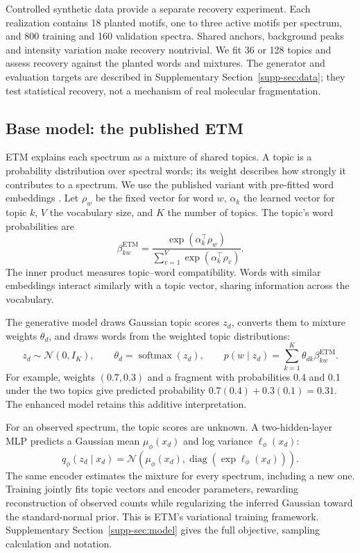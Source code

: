 \documentclass[10pt,a4paper]{article}
\newcommand{\softmax}{\operatorname{softmax}}
\begin{document}
Controlled synthetic data provide a separate recovery experiment. Each
realization contains 18 planted motifs, one to three active motifs per
spectrum, and 800 training and 160 validation spectra. Shared anchors,
background peaks and intensity variation make recovery nontrivial. We fit
36 or 128 topics and assess recovery against the planted words and mixtures.
The generator and evaluation targets are described in Supplementary
Section~\ref{supp-sec:data}; they test statistical recovery, not a mechanism
of real molecular fragmentation.

\subsection{Base model: the published ETM}
\label{sec:base-etm}

ETM explains each spectrum as a mixture of shared topics. A topic is a
probability distribution over spectral words; its weight describes how
strongly it contributes to a spectrum. We use the published variant with
pre-fitted word embeddings \cite{dieng2020}. Let $\rho_w$ be the fixed vector
for word $w$, $\alpha_k$ the learned vector for topic $k$, $V$ the vocabulary
size, and $K$ the number of topics. The topic's word probabilities are
\begin{equation}
 \beta^{\mathrm{ETM}}_{kw}=
 \frac{\exp(\alpha_k^\top\rho_w)}
      {\sum_{v=1}^{V}\exp(\alpha_k^\top\rho_v)}.
 \label{eq:base-beta}
\end{equation}
The inner product measures topic--word compatibility. Words with similar
embeddings interact similarly with a topic vector, sharing information
across the vocabulary.

The generative model draws Gaussian topic scores $z_d$, converts them to
mixture weights $\theta_d$, and draws words from the weighted topic distributions:
\begin{equation}
 z_d\sim\mathcal N(0,I_K),\qquad
 \theta_d=\softmax(z_d),\qquad
 p(w\mid z_d)=\sum_{k=1}^{K}\theta_{dk}\beta^{\mathrm{ETM}}_{kw}.
 \label{eq:base-generator}
\end{equation}
For example, weights $(0.7,0.3)$ and a fragment with probabilities 0.4 and
0.1 under the two topics give predicted probability $0.7(0.4)+0.3(0.1)=0.31$.
The enhanced model retains this additive interpretation.

For an observed spectrum, the topic scores are unknown. A two-hidden-layer
MLP predicts a Gaussian mean $\mu_\phi(x_d)$ and log variance $\ell_\phi(x_d)$:
\begin{equation}
 q_\phi(z_d\mid x_d)=\mathcal N\!\left(\mu_\phi(x_d),
             \operatorname{diag}(\exp\ell_\phi(x_d))\right).
 \label{eq:base-posterior}
\end{equation}
The same encoder estimates the mixture for every spectrum, including a new
one. Training jointly fits topic vectors and encoder parameters, rewarding
reconstruction of observed counts while regularizing the inferred Gaussian
toward the standard-normal prior. This is ETM's variational training
framework. Supplementary Section~\ref{supp-sec:model} gives the full objective,
sampling calculation and notation.
\end{document}
